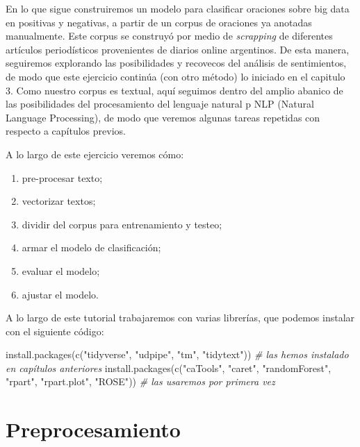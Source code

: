 \documentclass[
]{book}
\newenvironment{Shaded}{\begin{snugshade}}{\end{snugshade}}
\newcommand{\CommentTok}[1]{\textcolor[rgb]{0.56,0.35,0.01}{\textit{#1}}}
\newcommand{\FunctionTok}[1]{\textcolor[rgb]{0.00,0.00,0.00}{#1}}
\newcommand{\NormalTok}[1]{#1}
\newcommand{\StringTok}[1]{\textcolor[rgb]{0.31,0.60,0.02}{#1}}
\providecommand{\tightlist}{%
  \setlength{\itemsep}{0pt}\setlength{\parskip}{0pt}}
\begin{document}
En lo que sigue construiremos un modelo para clasificar oraciones sobre big data en positivas y negativas, a partir de un corpus de oraciones ya anotadas manualmente. Este corpus se construyó por medio de \emph{scrapping} de diferentes artículos periodísticos provenientes de diarios online argentinos. De esta manera, seguiremos explorando las posibilidades y recovecos del análisis de sentimientos, de modo que este ejercicio continúa (con otro método) lo iniciado en el capitulo 3. Como nuestro corpus es textual, aquí seguimos dentro del amplio abanico de las posibilidades del procesamiento del lenguaje natural p NLP (Natural Language Processing), de modo que veremos algunas tareas repetidas con respecto a capítulos previos.

A lo largo de este ejercicio veremos cómo:

\begin{enumerate}
\def\labelenumi{\arabic{enumi}.}
\tightlist
\item
  pre-procesar texto;
\item
  vectorizar textos;
\item
  dividir del corpus para entrenamiento y testeo;
\item
  armar el modelo de clasificación;
\item
  evaluar el modelo;
\item
  ajustar el modelo.
\end{enumerate}

A lo largo de este tutorial trabajaremos con varias librerías, que podemos instalar con el siguiente código:

\begin{Shaded}
\begin{Highlighting}[]
\FunctionTok{install.packages}\NormalTok{(}\FunctionTok{c}\NormalTok{(}\StringTok{"tidyverse"}\NormalTok{, }\StringTok{"udpipe"}\NormalTok{, }\StringTok{"tm"}\NormalTok{, }\StringTok{"tidytext"}\NormalTok{)) }\CommentTok{\# las hemos instalado en capítulos anteriores}
\FunctionTok{install.packages}\NormalTok{(}\FunctionTok{c}\NormalTok{(}\StringTok{"caTools"}\NormalTok{, }\StringTok{"caret"}\NormalTok{, }\StringTok{"randomForest"}\NormalTok{, }\StringTok{"rpart"}\NormalTok{, }\StringTok{"rpart.plot"}\NormalTok{, }\StringTok{"ROSE"}\NormalTok{)) }\CommentTok{\# las usaremos por primera vez}
\end{Highlighting}
\end{Shaded}

\hypertarget{preprocesamiento}{%
\section{Preprocesamiento}\label{preprocesamiento}}
\end{document}
